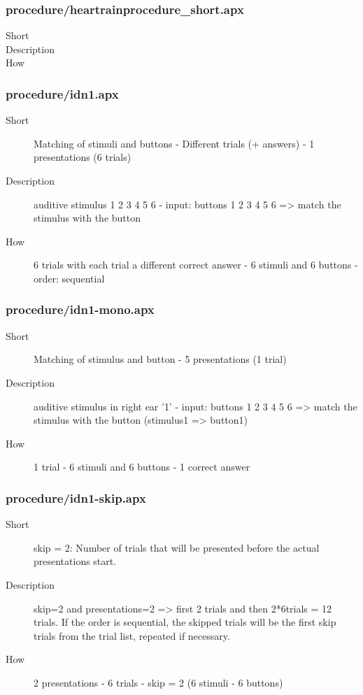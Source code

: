 \subsubsection{procedure/heartrainprocedure\_short.apx}
\begin{description}
\item[Short] 
\item[Description] 
\item[How] 
\end{description}

\subsubsection{procedure/idn1.apx}
\begin{description}
\item[Short] 
 Matching of stimuli and buttons - Different trials (+ answers) - 1 presentations (6 trials)
\item[Description] 
 auditive stimulus 1 2 3 4 5 6 - input: buttons 1 2 3 4 5 6 =\textgreater{} match the stimulus with the button
\item[How] 
 6 trials with each trial a different correct answer - 6 stimuli and 6 buttons - order: sequential
\end{description}

\subsubsection{procedure/idn1-mono.apx}
\begin{description}
\item[Short] 
 Matching of stimulus and button - 5 presentations (1 trial)
\item[Description] 
 auditive stimulus in right ear '1' - input: buttons 1 2 3 4 5 6 =\textgreater{} match the stimulus with the button (stimulus1 =\textgreater{} button1)
\item[How] 
 1 trial - 6 stimuli and 6 buttons - 1 correct answer
\end{description}

\subsubsection{procedure/idn1-skip.apx}
\begin{description}
\item[Short] 
 skip = 2: Number of trials that will be presented before the actual presentations start.
\item[Description] 
 skip=2 and presentations=2 =\textgreater{} first 2 trials and then 2*6trials = 12 trials. If the order is sequential, the skipped trials will be the first skip trials from the trial list, repeated if necessary.
\item[How] 
 2 presentations - 6 trials - skip = 2 (6 stimuli - 6 buttons)
\end{description}

